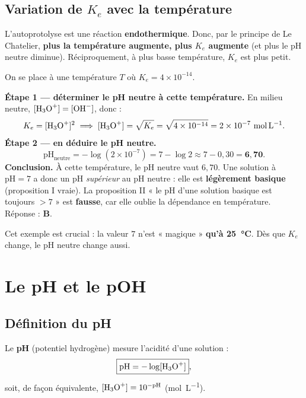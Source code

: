 \documentclass[11pt,a4paper]{article}
\begin{document}
\subsection{Variation de $K_e$ avec la température}

\begin{regle}
L'autoprotolyse est une réaction \textbf{endothermique}. Donc, par le principe de Le Chatelier, \textbf{plus
la température augmente, plus $K_e$ augmente} (et plus le pH neutre diminue). Réciproquement, à plus basse
température, $K_e$ est plus petit.
\end{regle}

\begin{exemple}
On se place à une température $T$ où $K_e = 4 \times 10^{-14}$.

\smallskip
\textbf{Étape 1 — déterminer le pH neutre à cette température.} En milieu neutre,
$[\ce{H3O+}] = [\ce{OH-}]$, donc :
\[ K_e = [\ce{H3O+}]^2 \;\Longrightarrow\; [\ce{H3O+}] = \sqrt{K_e} = \sqrt{4\times10^{-14}} = 2\times10^{-7}\ \si{mol.L^{-1}}. \]
\textbf{Étape 2 — en déduire le pH neutre.}
\[ \mathrm{pH}_{\text{neutre}} = -\log(2\times10^{-7}) = 7 - \log 2 \approx 7 - 0{,}30 = \mathbf{6{,}70}. \]
\textbf{Conclusion.} À cette température, le pH neutre vaut $6{,}70$. Une solution à $\mathrm{pH}=7$ a donc
un pH \emph{supérieur} au pH neutre : elle est \textbf{légèrement basique} (proposition I vraie). La
proposition II « le pH d'une solution basique est toujours $>7$ » est \textbf{fausse}, car elle oublie la
dépendance en température. Réponse : \textbf{B}.

\smallskip
Cet exemple est crucial : la valeur $7$ n'est « magique » \textbf{qu'à \SI{25}{\celsius}}. Dès que $K_e$
change, le pH neutre change aussi.
\end{exemple}

\section{Le pH et le pOH}

\subsection{Définition du pH}

\begin{formule}[définition du pH]
Le \textbf{pH} (potentiel hydrogène) mesure l'acidité d'une solution :
\[ \boxed{\mathrm{pH} = -\log[\ce{H3O+}]}, \]
soit, de façon équivalente, $[\ce{H3O+}] = 10^{-\mathrm{pH}}$ (\si{mol.L^{-1}}).
\end{formule}
\end{document}
